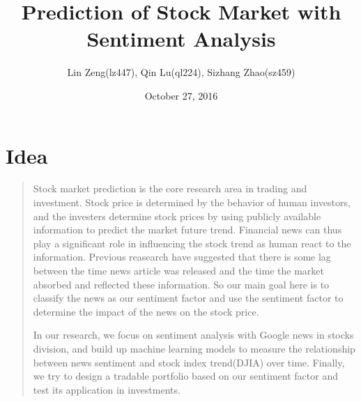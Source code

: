 \documentclass[english]{article}
\begin{document}
\title{Prediction of Stock Market with Sentiment Analysis}

\author{Lin Zeng(lz447), Qin Lu(ql224), Sizhang Zhao(sz459)}

\date{October 27, 2016}
\maketitle

\section{Idea}
\begin{quotation}
Stock market prediction is the core research area in trading and investment.
Stock price is determined by the behavior of human investors, and
the investers determine stock prices by using publicly available information
to predict the market future trend. Financial news can thus play a
significant role in influencing the stock trend as human react to
the information. Previous reasearch have suggested that there is some
lag between the time news article was released and the time the market
absorbed and reflected these information. So our main goal here is
to classify the news as our sentiment factor and use the sentiment
factor to determine the impact of the news on the stock price. 

In our research, we focus on sentiment analysis with Google news in
stocks division, and build up machine learning models to measure the
relationship between news sentiment and stock index trend(DJIA) over
time. Finally, we try to design a tradable portfolio based on our
sentiment factor and test its application in investments. 
\end{quotation}
\end{document}
